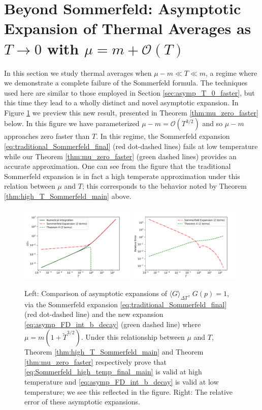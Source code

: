 \documentclass[sn-mathphys,Numbered]{sn-jnl}
\begin{document}
\section{Beyond Sommerfeld: Asymptotic Expansion of Thermal Averages as $T\to 0$ with $\mu=m+\mathcal{O}(T)$}\label{sec:asympt_Delta_mu_order_T}
In this section we study thermal averages when $\mu-m\ll T\ll m$, a regime where we demonstrate a complete failure of the Sommerfeld formula. The techniques used here are similar to those employed in Section \ref{sec:asymp_T_0_faster}, but this time they lead to a wholly distinct and novel asymptotic expansion.  In Figure \ref{fig:FD_avg_expansion_comparison_Sommerfeld} we preview this new result, presented in Theorem \ref{thm:mu_zero_faster} below.  In this figure we have parameterized $\mu-m=\mathcal{O}(T^{3/2})$ and so $\mu-m$ approaches zero faster than $T$.  In this regime, the Sommerfeld expansion \eqref{eq:traditional_Sommerfeld_final} (red dot-dashed lines) fails at low temperature while our Theorem \ref{thm:mu_zero_faster} (green dashed lines) provides an accurate approximation.  One can see from the figure that the traditional Sommerfeld expansion is in fact a high temperate approximation under this  relation between $\mu$ and $T$; this corresponds to the behavior noted by Theorem \ref{thm:high_T_Sommerfeld_main} above.
\begin{figure}[b]
\centering
\includegraphics[width=0.49\textwidth]{./plot/Sommerfeld_high_temp_comparison.pdf}
\includegraphics[width=0.49\textwidth]{./plot/Sommerfeld_high_temp_relative_error_comparison.pdf}
\caption{Left: Comparison of asymptotic expansions of $\langle G\rangle_{\Delta T}$, $G(p)=1$, via the Sommerfeld expansion \eqref{eq:traditional_Sommerfeld_final} (red dot-dashed line) and the new expansion  \eqref{eq:asymp_FD_int_b_decay}  (green dashed  line) where  $\mu=m(1+\widetilde{T}^{3/2})$.  Under this relationship between $\mu$ and $T$, Theorem \ref{thm:high_T_Sommerfeld_main} and Theorem \ref{thm:mu_zero_faster} respectively prove that \eqref{eq:Sommerfeld_high_temp_final_main} is valid at high temperature and \eqref{eq:asymp_FD_int_b_decay} is valid at low temperature; we see this reflected in the figure. Right: The relative error of these asymptotic expansions.  }\label{fig:FD_avg_expansion_comparison_Sommerfeld}
\end{figure}
\end{document}
